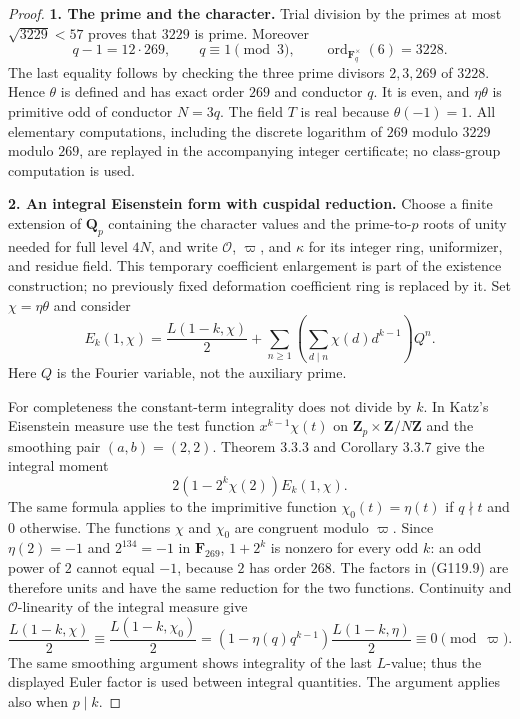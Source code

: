 \begin{proof}
\textbf{1. The prime and the character.}
Trial division by the primes at most $\sqrt{3229}<57$ proves that
$3229$ is prime.  Moreover
\[
 q-1=12\cdot269,\qquad q\equiv1\pmod3,
 \qquad \operatorname{ord}_{\mathbf F_q^\times}(6)=3228.
 \tag{G119.7}
\]
The last equality follows by checking the three prime divisors
$2,3,269$ of $3228$.
Hence $\theta$ is defined and has exact order $269$ and conductor $q$.
It is even, and $\eta\theta$ is primitive odd of conductor $N=3q$.
The field $T$ is real because $\theta(-1)=1$.
All elementary computations, including the discrete logarithm of
$269$ modulo $3229$ modulo $269$, are replayed in the accompanying
integer certificate; no class-group computation is used.

\textbf{2. An integral Eisenstein form with cuspidal reduction.}
Choose a finite extension of $\mathbf Q_p$ containing the character
values and the prime-to-$p$ roots of unity needed for full level $4N$,
and write $\mathcal O$, $\varpi$, and $\kappa$ for its integer ring,
uniformizer, and residue field.
This temporary coefficient enlargement is part of the existence
construction; no previously fixed deformation coefficient ring is
replaced by it.
Set $\chi=\eta\theta$ and consider
\[
 E_k(1,\chi)
  =\frac{L(1-k,\chi)}2+
    \sum_{n\ge1}\left(\sum_{d\mid n}\chi(d)d^{k-1}\right)Q^n.
 \tag{G119.8}
\]
Here $Q$ is the Fourier variable, not the auxiliary prime.

For completeness the constant-term integrality does not divide by
$k$.  In Katz's Eisenstein measure use the test function
$x^{k-1}\chi(t)$ on $\mathbf Z_p\times\mathbf Z/N\mathbf Z$ and
the smoothing pair $(a,b)=(2,2)$.
Theorem 3.3.3 and Corollary 3.3.7 give the integral moment
\[
 2(1-2^k\chi(2))E_k(1,\chi).
 \tag{G119.9}
\]
The same formula applies to the imprimitive function
$\chi_0(t)=\eta(t)$ if $q\nmid t$ and $0$ otherwise.
The functions $\chi$ and $\chi_0$ are congruent modulo $\varpi$.
Since $\eta(2)=-1$ and $2^{134}=-1$ in $\mathbf F_{269}$,
$1+2^k$ is nonzero for every odd $k$: an odd power of $2$ cannot
equal $-1$, because $2$ has order $268$.
The factors in (G119.9) are therefore units and have the same
reduction for the two functions.
Continuity and $\mathcal O$-linearity of the integral measure give
\[
 \frac{L(1-k,\chi)}2\equiv
 \frac{L(1-k,\chi_0)}2
  =(1-\eta(q)q^{k-1})\frac{L(1-k,\eta)}2
  \equiv0\pmod{\varpi}.
 \tag{G119.10}
\]
The same smoothing argument shows integrality of the last
$L$-value; thus the displayed Euler factor is used between integral
quantities.  The argument applies also when $p\mid k$.


\end{proof}
